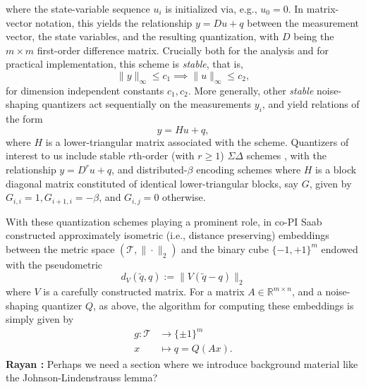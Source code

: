 \documentclass{article}
\newcommand{\comment}[3]{{\color{#1} {\bf #2 :} #3}}
\newcommand{\rayan}[1]{\comment{red}{Rayan}{#1}}
\newcommand{\R}{\mathbb{R}}
\newcommand{\sign}{\mathrm{sign}}
\begin{document}
where the state-variable sequence $u_i$ is initialized via, e.g., $u_0=0$. In matrix-vector notation, this yields the relationship $y=Du+q$  between the measurement vector, the state variables, and the resulting quantization, with $D$ being the $m\times m$ first-order difference matrix. Crucially both for the analysis and for practical implementation, this scheme is \emph{stable}, that is, $$\|y\|_\infty \leq c_1 \implies \|u\|_\infty \leq c_2,$$ for dimension independent constants $c_1,c_2$. More generally, other \emph{stable} noise-shaping quantizers act sequentially on the measurements $y_i$, %
and yield relations of the form 
$$ y=Hu + q,$$ where $H$ is a lower-triangular matrix associated with the scheme. Quantizers of interest to us include
stable $r$th-order (with $r\geq 1$) $\Sigma\Delta$ schemes  \cite{}, with the relationship $y=D^r u+q$, and distributed-$\beta$ encoding schemes \cite{} where $H$ is a block diagonal matrix constituted of identical lower-triangular blocks, say $G$, given by $G_{i,i}=1, G_{i+1,i}=-\beta$, and $G_{i,j}=0$ otherwise.

With these quantization schemes playing a prominent role, in  \cite{huynh2018fast} co-PI Saab  constructed approximately isometric (i.e., distance preserving) embeddings between the metric space  $(\mathcal{T}, \|\cdot\|_2)$ and the binary  cube $\{-1,+1\}^m$ endowed with the pseudometric
$$d_{{V}}(\tilde{q},q) := \| {V}(\tilde{q} -{q}) \|_2$$
where $V$ is a carefully constructed matrix.
For a  matrix $A\in\R^{m\times n}$, and a noise-shaping quantizer $Q$, as above, the algorithm for computing these embeddings is simply given by \begin{align}
g: \mathcal{T} &\to \{\pm 1\}^m\nonumber\\
x &\mapsto q=Q(Ax).\nonumber
\end{align}
\rayan{Perhaps we need a section where we introduce background material like the  Johnson-Lindenstrauss lemma?}
\end{document}
